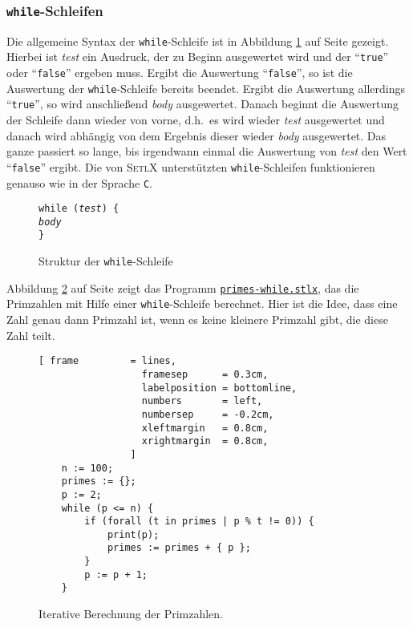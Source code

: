 \subsubsection{\texttt{while}-Schleifen}
Die allgemeine Syntax der \texttt{while}-Schleife ist in Abbildung \ref{fig:while} auf Seite
\pageref{fig:while} gezeigt.  Hierbei ist \textsl{test} ein Ausdruck, der zu
Beginn ausgewertet wird und der ``\texttt{true}'' oder ``\texttt{false}'' ergeben muss.
Ergibt die Auswertung ``\texttt{false}'', so ist die Auswertung der
\texttt{while}-Schleife bereits beendet. Ergibt die Auswertung allerdings
``\texttt{true}'', so wird anschließend \textsl{body} ausgewertet.  Danach beginnt
die Auswertung der Schleife dann wieder von vorne, d.h.~es wird wieder
\textsl{test} ausgewertet und danach wird abhängig von dem Ergebnis dieser
wieder \textsl{body} ausgewertet.  Das ganze passiert so lange, bis irgendwann
einmal die Auswertung von \textsl{test} den Wert ``\texttt{false}'' ergibt.
Die von \textsc{SetlX} unterstützten \texttt{while}-Schleifen funktionieren genauso wie in
der Sprache \texttt{C}.

\begin{figure}[!ht]
  \centering
\begin{alltt}
      \texttt{while (}\textsl{test}\texttt{) \{}
          \textsl{body}
      \texttt{\}}
\end{alltt}
\vspace*{-0.3cm}
\caption{Struktur der \texttt{while}-Schleife}  \label{fig:while}
\end{figure} 

Abbildung \ref{fig:primes-while.stlx} auf Seite
\pageref{fig:primes-while.stlx} zeigt das Programm
\href{https://github.com/karlstroetmann/Logik/blob/master/SetlX/primes-while.stlx}{\texttt{primes-while.stlx}},
das die Primzahlen mit Hilfe einer \texttt{while}-Schleife berechnet.
Hier ist die Idee, dass eine Zahl genau dann Primzahl ist, wenn es keine
kleinere Primzahl gibt, die diese Zahl teilt.

\begin{figure}[!ht]
  \centering
\begin{Verbatim}[ frame         = lines, 
                  framesep      = 0.3cm, 
                  labelposition = bottomline,
                  numbers       = left,
                  numbersep     = -0.2cm,
                  xleftmargin   = 0.8cm,
                  xrightmargin  = 0.8cm,
                ]
    n := 100;
    primes := {};
    p := 2;
    while (p <= n) {
        if (forall (t in primes | p % t != 0)) {
            print(p);
            primes := primes + { p };
        }
        p := p + 1;
    }
\end{Verbatim} 
\vspace*{-0.3cm}
\caption{Iterative Berechnung der Primzahlen.}  \label{fig:primes-while.stlx}
\end{figure} %


